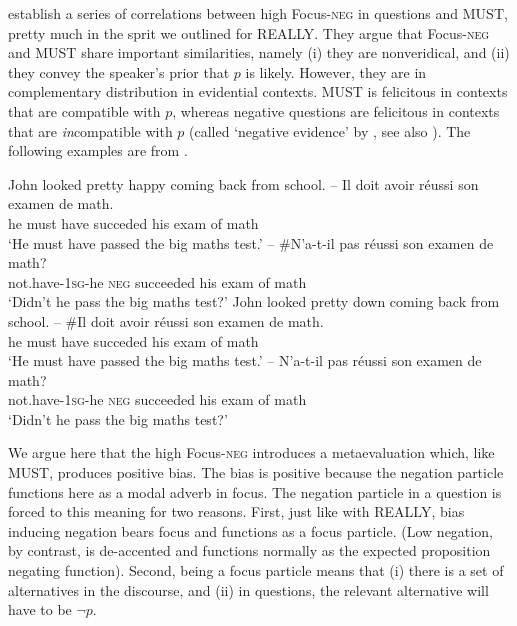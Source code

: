 \documentclass[output=paper,colorlinks,citecolor=brown]{langscibook}
\begin{document}
\citet{larrivee2022} establish a series of correlations between high Focus-\textsc{neg}  in questions and \textsc{MUST}, pretty much in the sprit we outlined for \textsc{REALLY}. They argue that  Focus-\textsc{neg} and \textsc{MUST} share important similarities, namely (i) they are nonveridical, and (ii) they convey the speaker's prior that $p$ is likely. However, they are in complementary distribution in evidential contexts. \textsc{MUST} is felicitous in contexts that are compatible with $p$, whereas negative questions are felicitous in contexts that are \textit{in}compatible with $p$ (called `negative evidence' by \citealt{buring2000}, see also \citealt{sudo2013}). The following examples are from \citet{larrivee2022}. 

\ea John looked pretty happy coming back from school.
\ea -- \gll Il doit avoir réussi son examen de math.\\
he must have succeded his exam of math \\
\glt `He must have passed the big maths test.'
\ex -- \gll \#N'a-t-il pas réussi son examen de math?\\
not.have-\textsc{1sg-}he \textsc{neg} succeeded his exam of math \\
\glt `Didn't he pass the big maths test?'
\label{happypos}
\z
\ex John looked pretty down coming back from school. 
\ea -- \#\gll Il doit avoir réussi son examen de math. \\
he must have succeded his exam of math \\
\glt `He must have passed the big maths test.'
\ex -- \gll N'a-t-il pas réussi son examen de math? \\ 
not.have\textsc{-1sg-}he \textsc{neg} succeeded his exam of math \\
\glt `Didn't he pass the big maths test?' \label{sadneg}
\z
\z


We argue here that the high  Focus-\textsc{neg} introduces a metaevaluation which, like \textsc{MUST}, produces positive bias. The bias is positive because the negation particle functions here as a modal adverb in focus. The negation particle in a question is forced to this meaning for two reasons. First, just like with \textsc{REALLY}, bias inducing negation bears focus and functions as a focus particle. (Low negation, by contrast, is de-accented and functions normally as the expected proposition negating function). Second, being a focus particle means that (i)  there is a set of alternatives in the discourse, and (ii) in questions, the relevant alternative will have to be  $\neg p$. 
\end{document}
